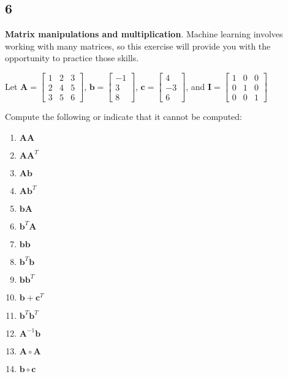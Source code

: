 \documentclass[11pt]{article}
\providecommand{\tightlist}{%
      \setlength{\itemsep}{0pt}\setlength{\parskip}{0pt}}
\begin{document}
    \subsection{6}\label{section}

\textbf{Matrix manipulations and multiplication}. Machine learning
involves working with many matrices, so this exercise will provide you
with the opportunity to practice those skills.

Let
\(\mathbf{A} = \begin{bmatrix} 1 & 2 & 3 \\ 2 & 4 & 5 \\ 3 & 5 & 6 \end{bmatrix}\),
\(\mathbf{b} = \begin{bmatrix} -1 \\ 3 \\ 8 \end{bmatrix}\),
\(\mathbf{c} = \begin{bmatrix} 4 \\ -3 \\ 6 \end{bmatrix}\), and
\(\mathbf{I} = \begin{bmatrix} 1 & 0 & 0 \\ 0 & 1 & 0 \\ 0 & 0 & 1 \end{bmatrix}\)

Compute the following or indicate that it cannot be computed:

\begin{enumerate}
\def\labelenumi{\arabic{enumi}.}
\tightlist
\item
  \(\mathbf{A}\mathbf{A}\)
\item
  \(\mathbf{A}\mathbf{A}^T\)
\item
  \(\mathbf{A}\mathbf{b}\)
\item
  \(\mathbf{A}\mathbf{b}^T\)
\item
  \(\mathbf{b}\mathbf{A}\)
\item
  \(\mathbf{b}^T\mathbf{A}\)
\item
  \(\mathbf{b}\mathbf{b}\)
\item
  \(\mathbf{b}^T\mathbf{b}\)
\item
  \(\mathbf{b}\mathbf{b}^T\)
\item
  \(\mathbf{b} + \mathbf{c}^T\)
\item
  \(\mathbf{b}^T\mathbf{b}^T\)
\item
  \(\mathbf{A}^{-1}\mathbf{b}\)
\item
  \(\mathbf{A}\circ\mathbf{A}\)
\item
  \(\mathbf{b}\circ\mathbf{c}\)
\end{enumerate}
\end{document}

